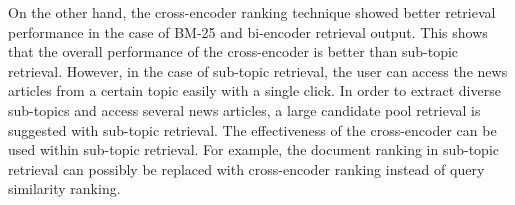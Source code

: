 On the other hand, the cross-encoder ranking technique showed better retrieval performance in the case of BM-25 and bi-encoder retrieval output. This shows that the overall performance of the cross-encoder is better than sub-topic retrieval. However, in the case of sub-topic retrieval, the user can access the news articles from a certain topic easily with a single click. In order to extract diverse sub-topics and access several news articles, a large candidate pool retrieval is suggested with sub-topic retrieval. The effectiveness of the cross-encoder can be used within sub-topic retrieval. For example, the document ranking in sub-topic retrieval can possibly be replaced with cross-encoder ranking instead of query similarity ranking.


 


